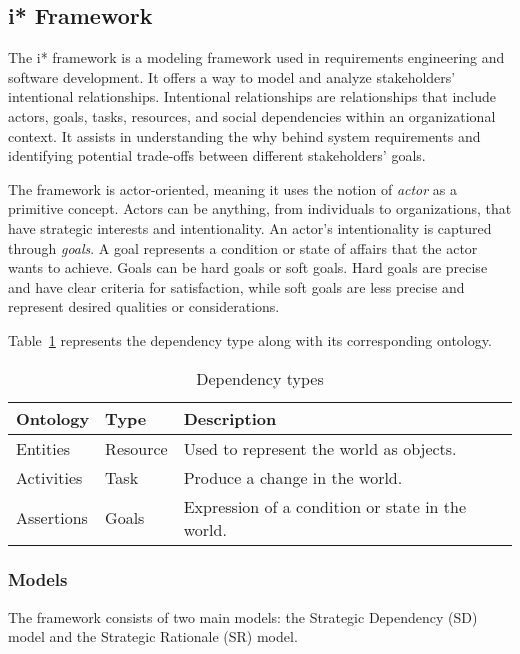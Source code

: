 \subsection{i* Framework}
The i* framework \parencite{yu1995} is a modeling framework used in requirements engineering and software development.
It offers a way to model and analyze stakeholders' intentional relationships.
Intentional relationships are relationships that include actors, goals, tasks, resources, and social dependencies within an organizational context.
It assists in understanding the why behind system requirements and identifying potential trade-offs between different stakeholders' goals.

The framework is actor-oriented, meaning it uses the notion of \textit{actor} as a primitive concept.
Actors can be anything, from individuals to organizations, that have strategic interests and intentionality.
An actor's intentionality is captured through \textit{goals}.
A goal represents a condition or state of affairs that the actor wants to achieve.
Goals can be hard goals or soft goals.
Hard goals are precise and have clear criteria for satisfaction, while soft goals are less precise and represent desired qualities or considerations.

Table~\ref{tab:istarDependencyTypes} represents the dependency type along with its corresponding ontology.
\begin{table}
	\caption{Dependency types}\label{tab:istarDependencyTypes}
	\begin{tabularx}{\textwidth}{@{} llX @{}}
		\toprule
		\textbf{Ontology} & \textbf{Type} & \textbf{Description} \\
		\midrule
		Entities & Resource & Used to represent the world as objects. \\
		Activities & Task & Produce a change in the world. \\
		Assertions & Goals & Expression of a condition or state in the world. \\
		\bottomrule
	\end{tabularx}
\end{table}

\subsubsection{Models}
The framework consists of two main models: the Strategic Dependency (SD) model and the Strategic Rationale (SR) model.

